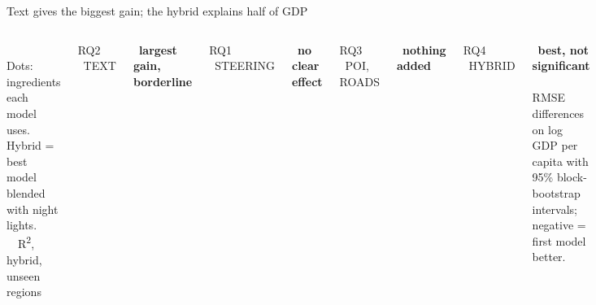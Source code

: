 \documentclass[aspectratio=169,10pt]{beamer}
\gdef\curstage{0}
\newcommand{\setstage}[1]{\gdef\curstage{#1}}
\newcommand{\chip}[2]{{\setlength{\fboxsep}{1.8pt}\colorbox{#1}{\fontsize{6}{7}\selectfont\bfseries\color{white}\strut #2}}}
\newcommand{\fnote}[1]{{\fontsize{7}{8.5}\selectfont\color{muted}#1}}
\begin{document}
\setstage{5}
\begin{frame}{Text gives the biggest gain; the hybrid explains half of GDP}
\begin{columns}[c,onlytextwidth]
\resizebox{!}{5.2cm}{}\\[2pt]
\fnote{Dots: ingredients each model uses. Hybrid = best model blended with night lights.}
{\blackfont\fontsize{24}{26}\selectfont\color{ink}\nHybridR}\ \ {\fontsize{7.5}{9}\selectfont\color{muted}R\textsuperscript{2}, hybrid, unseen regions}\\[8pt]
\chip{ctxt}{RQ2 \ TEXT} \ {\footnotesize\bfseries largest gain, borderline}\\[-1pt]\fnote{\RQtwo}\\[5pt]
\chip{muted}{RQ1 \ STEERING} \ {\footnotesize\bfseries no clear effect}\\[-1pt]\fnote{\RQone}\\[5pt]
\chip{muted}{RQ3 \ POI, ROADS} \ {\footnotesize\bfseries nothing added}\\[-1pt]\fnote{\RQthree}\\[5pt]
\chip{cntl}{RQ4 \ HYBRID} \ {\footnotesize\bfseries best, not significant}\\[-1pt]\fnote{\RQfour}\\[5pt]
\fnote{RMSE differences on log GDP per capita with 95\% block-bootstrap intervals; negative = first model better.}
\end{columns}
\end{frame}
\end{document}
